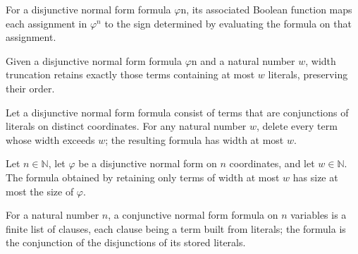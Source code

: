 \begin{definition}
\label{FABL.DNFFormula.toBooleanFunction}
\leanok
{}
For a disjunctive normal form formula $\varphi$n, its associated Boolean function maps each
assignment in $\varphi^n$ to the sign determined by evaluating the formula on that assignment.
\end{definition}

\begin{definition}
\label{FABL.DNFFormula.truncateWidth}
\leanok
{}
Given a disjunctive normal form formula $\varphi$n and a natural number $w$, width truncation
retains exactly those terms containing at most $w$ literals, preserving their order.
\end{definition}

\begin{theorem}
\label{FABL.DNFFormula.width_truncateWidth_le}
\leanok
{}
Let a disjunctive normal form formula consist of terms that are conjunctions of literals
on distinct coordinates. For any natural number $w$, delete every term whose width
exceeds $w$; the resulting formula has width at most $w$.
\end{theorem}

\begin{theorem}
\label{FABL.DNFFormula.size_truncateWidth_le}
\leanok
{}
Let $n\in\mathbb N$, let $\varphi$ be a disjunctive normal form on $n$ coordinates, and
let $w\in\mathbb N$. The formula obtained by retaining only terms of width at most $w$
has size at most the size of $\varphi$.
\end{theorem}

\begin{definition}
\label{FABL.CNFFormula}
\leanok
{}
For a natural number $n$, a conjunctive normal form formula on $n$ variables is a finite
list of clauses, each clause being a term built from literals; the formula is the
conjunction of the disjunctions of its stored literals.
\end{definition}

